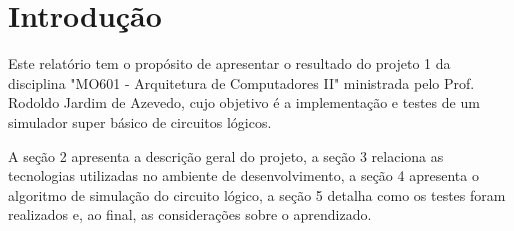 \section{Introdução}

Este relatório tem o propósito de apresentar o resultado do projeto 1 da 
disciplina "MO601 - Arquitetura de Computadores II" ministrada pelo Prof. Rodoldo Jardim de Azevedo, cujo 
objetivo é a implementação e testes de um simulador super básico de circuitos lógicos.

A seção 2 apresenta a descrição geral do projeto, a seção 3 relaciona as tecnologias utilizadas 
no ambiente de desenvolvimento, a seção 4 apresenta 
o algoritmo de simulação do circuito lógico, a seção 5 detalha como os testes foram realizados e, 
ao final, as considerações sobre o aprendizado.